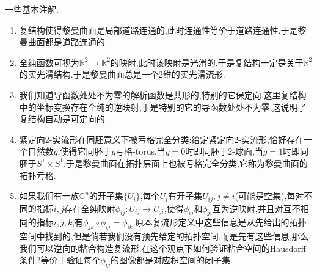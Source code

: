 一些基本注解.
\begin{enumerate}
	\item 复结构使得黎曼曲面是局部道路连通的,此时连通性等价于道路连通性.于是黎曼曲面都是道路连通的.
	\item 全纯函数可视为$\mathbb{R}^2\to\mathbb{R}^2$的映射,此时该映射是光滑的.于是复结构一定是关于$\mathbb{R}^2$的实光滑结构.于是黎曼曲面总是一个2维的实光滑流形.
	\item 我们知道导函数处处不为零的解析函数是共形的,特别的它保定向.这里复结构中的坐标变换存在全纯的逆映射,于是特别的它的导函数处处不为零.这说明了复结构自动是可定向的.
	\item 紧定向2-实流形在同胚意义下被亏格完全分类:给定紧定向2-实流形,恰好存在一个自然数$g$,使得它同胚于$g$亏格-torus.当$g=0$时即同胚于2-球面,当$g=1$时即同胚于$S^1\times S^1$.于是黎曼曲面在拓扑层面上也被亏格完全分类,它称为黎曼曲面的拓扑亏格.
	\item 如果我们有一族$\mathbb{C}^n$的开子集$\{U_i\}$,每个$U_i$有开子集$U_{ij},j\not=i$(可能是空集),每对不同的指标$i,j$存在全纯映射$\phi_{ij}:U_{ij}\to U_{ji}$,使得$\phi_{ij}$和$\phi_{ji}$互为逆映射,并且对互不相同的指标$i,j,k$,有$\phi_{jk}\circ\phi_{ij}=\phi_{ik}$.原本复流形定义中这些信息是从先给出的拓扑空间中找到的,但是倘若我们没有预先给定的拓扑空间,而是先有这些信息,那么我们可以逆向的粘合构造复流形.在这个观点下如何验证粘合空间的Hausdorff条件?等价于验证每个$\phi_{ij}$的图像都是对应积空间的闭子集.
\end{enumerate}

